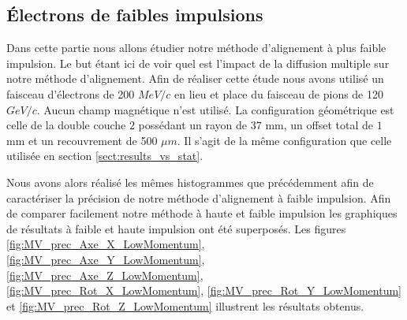 %   
%   
% 
%   
  \subsection{Électrons de faibles impulsions}

  Dans cette partie nous allons \'etudier notre m\'ethode d'alignement \`a plus faible impulsion. Le but \'etant ici de voir quel est l'impact de la diffusion multiple sur notre m\'ethode d'alignement. Afin de r\'ealiser cette \'etude nous avons utilis\'e un faisceau d'\'electrons de 200 $MeV/c$ en lieu et place du faisceau de pions de 120 $GeV/c$. Aucun champ magn\'etique n'est utilis\'e. La configuration g\'eom\'etrique est celle de la double couche 2 poss\'edant un rayon de $37$ mm, un offset total de $1$ mm et un recouvrement de 500 $\mu m$. Il s'agit de la m\^eme configuration que celle utilis\'ee en section \ref{sect:results_vs_stat}.
  
  \medskip

  Nous avons alors r\'ealis\'e les m\^emes histogrammes que pr\'ec\'edemment afin de caract\'eriser la pr\'ecision de notre m\'ethode d'alignement \`a faible impulsion. Afin de comparer facilement notre m\'ethode \`a haute et faible impulsion les graphiques de r\'esultats \`a faible et haute impulsion ont \'et\'e superpos\'es. Les figures \ref{fig:MV_prec_Axe_X_LowMomentum}, \ref{fig:MV_prec_Axe_Y_LowMomentum}, \ref{fig:MV_prec_Axe_Z_LowMomentum}, \ref{fig:MV_prec_Rot_X_LowMomentum}, \ref{fig:MV_prec_Rot_Y_LowMomentum} et \ref{fig:MV_prec_Rot_Z_LowMomentum} illustrent les r\'esultats obtenus. 
  
  \medskip
  
